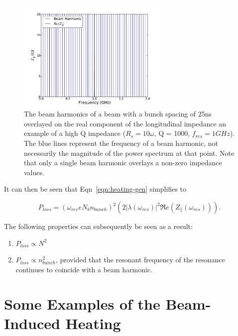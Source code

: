 \begin{figure}
\begin{center}
\includegraphics[width=0.65\textwidth]{Wakefields_and_Impedances/figures/high_q_1000_resonance_beam_harmonics.pdf}
\end{center}
\label{fig:high_q_harmonics}
\caption{The beam harmonics of a beam with a bunch spacing of 25ns overlayed on the real component of the longitudinal impedance an example of a high Q impedance ($R_{s}=10\omega$, Q = 1000, $f_{res}=1GHz$). The blue lines represent the frequency of a beam harmonic, not necessarily the magnitude of the power spectrum at that point. Note that only a single beam harmonic overlays a non-zero impedance values.}
\end{figure}

It can then be seen that Eqn~\ref{eqn:heating-gen} simplifies to

\begin{equation}
P_{loss} = \left( \omega_{rev}eN_{b}n_{bunch}  \right)^{2}  \left( 2 \left| \lambda \left( \omega_{res} \right)  \right|^{2}  \Re{}e \left( Z_{\parallel} \left(\omega_{res} \right) \right) \right). 
\label{ean:heating-high-q}
\end{equation}

The following properties can subsequently be seen as a result:

\begin{enumerate}
\item{$P_{loss} \propto N^{2}$}
\item{$P_{loss} \propto n_{bunch}^{2}$, provided that the resonant frequency of the resonance continues to coincide with a beam harmonic.}
\end{enumerate}

\section{Some Examples of the Beam-Induced Heating}

